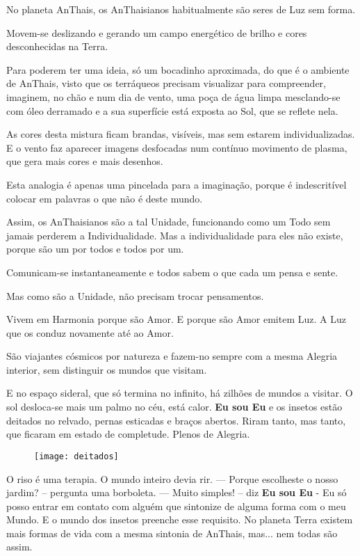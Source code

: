 No planeta AnThais, os AnThaisianos habitualmente são seres de Luz sem forma.

Movem-se deslizando e gerando um campo energético de brilho e cores desconhecidas na Terra.

Para poderem ter uma ideia, só um bocadinho aproximada, do que é o ambiente de AnThais, visto que os terráqueos precisam visualizar para compreender, imaginem, no chão e num dia de vento, uma poça de água limpa mesclando-se com óleo derramado e a sua superfície está exposta ao Sol, que se reflete nela.

As cores desta mistura ficam brandas, visíveis, mas sem estarem individualizadas. E o vento faz aparecer imagens desfocadas num contínuo movimento de plasma, que gera mais cores e mais desenhos.

Esta analogia é apenas uma pincelada para a imaginação, porque é indescritível colocar em palavras o que não é deste mundo.

Assim, os AnThaisianos são a tal Unidade, funcionando como um Todo sem jamais perderem a Individualidade. Mas a individualidade para eles não existe, porque são um por todos e todos por um.

Comunicam-se instantaneamente e todos sabem o que cada um pensa e sente.

Mas como são a Unidade, não precisam trocar pensamentos.

Vivem em Harmonia porque são Amor. E porque são Amor emitem Luz. A Luz que os conduz novamente até ao Amor.

São viajantes cósmicos por natureza e fazem-no sempre com a mesma Alegria interior, sem distinguir os mundos que visitam.

E no espaço sideral, que só termina no infinito, há zilhões de mundos a visitar.
\bigbreak
O sol desloca-se mais um palmo no céu, está calor.
\bigbreak
\textbf{Eu sou Eu} e os insetos estão deitados no relvado, pernas esticadas e braços abertos. Riram tanto, mas tanto, que ficaram em estado de completude. Plenos de Alegria.
\bigbreak

\begin{figure}[h]
    \centering
    \texttt{[image: deitados]}
\end{figure}

O riso é uma terapia. O mundo inteiro devia rir.
\bigbreak
— Porque escolheste o nosso jardim? – pergunta uma borboleta.
\bigbreak
— Muito simples! – diz \textbf{Eu sou Eu} - Eu só posso entrar em contato com alguém que sintonize de alguma forma com o meu Mundo. E o mundo dos insetos preenche esse requisito. No planeta Terra existem mais formas de vida com a mesma sintonia de AnThais, mas... nem todas são assim.

